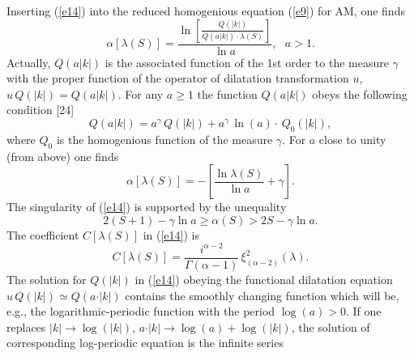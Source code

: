 \documentclass[WPCF,manyauthors]{wpcfTemplate}
\begin{document}
Inserting (\ref{e14}) into the reduced homogenious equation (\ref{e9}) for AM, one finds
$$ \alpha[\lambda (S)] = \frac{\ln\left [\frac{Q(\vert k \vert)}{Q(a\vert k \vert)\cdot\lambda (S)}\right ]}{\ln a},\,\,\,\, a > 1. $$
Actually, $Q(a\vert k\vert)$ is the associated function of the 1st order to the measure $\gamma$ with the  proper function of the operator of dilatation transformation $u$, $u\,Q(\vert k\vert) = Q(a\vert k\vert)$. For any $a \geq 1$ the function $Q(a\vert k\vert)$ obeys the following condition [24]
$$Q(a\vert k\vert) = a^{\gamma}\,Q (\vert k \vert) + a^{\gamma}\,\ln (a)\cdot\, Q_{0}(\vert k\vert),$$
where $Q_{0}$ is the homogenious function of the measure $\gamma$. 
For $a$ close to unity (from above) one finds
$$ \alpha[\lambda (S)] = -\left [\frac{\ln\lambda (S)}{\ln a} + \gamma\right ]. $$
The singularity of (\ref{e14}) is supported by the unequality 
$$ 2(S+1) - \gamma\ln a \geq \alpha (S) > 2S - \gamma\ln a. $$
The coefficient $C [\lambda (S)]$ in (\ref{e14}) is 
$$ C[\lambda (S)] = \frac{i^{\alpha -2}}{\Gamma(\alpha-1)}\,\xi^{2}_{(\alpha -2)}(\lambda). $$
The solution for $Q(\vert k\vert)$ in (\ref{e14}) obeying  the functional dilatation equation
$ u\,Q(\vert k\vert) \simeq Q(a\cdot\vert k\vert)$
contains the smoothly changing function which will be, e.g., the logarithmic-periodic function with the period $\log(a) > 0$. If one replaces $\vert k\vert\rightarrow \log (\vert k\vert )$, $a\cdot \vert k\vert\rightarrow \log (a) +\log (\vert k\vert )$, the solution of corresponding log-periodic equation is the infinite series
\end{document}
